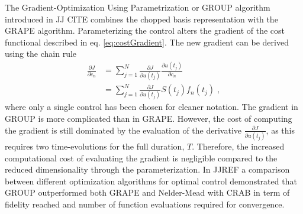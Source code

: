 The Gradient-Optimization Using Parametrization or \textsc{GROUP} algorithm introduced in JJ CITE combines the chopped basis representation with the \textsc{GRAPE} algorithm. Parameterizing the control alters the gradient of the cost functional described in eq. \eqref{eq:costGradient}. The new gradient can be derived using the chain rule
\begin{align}
	\frac{\partial J }{\partial c_n} &= \sum_{j = 1}^{N} \frac{\partial J }{\partial u(t_j)} \frac{\partial u(t_j)}{\partial c_n} \nonumber \\
	&= \sum_{j = 1}^{N} \frac{\partial J }{\partial u(t_j)} S(t_j) f_n(t_j) \; , \label{eq:GROUPgradient} 
\end{align}
where only a single control has been chosen for cleaner notation. The gradient in \textsc{GROUP} is more complicated than in \textsc{GRAPE}. However, the cost of computing the gradient is still dominated by the evaluation of the derivative $\frac{\partial J }{\partial u(t_j)}$, as this requires two time-evolutions for the full duration, $T$. Therefore, the increased computational cost of evaluating the gradient is negligible compared to the reduced dimensionality through the parameterization. 
In JJREF a comparison between different optimization algorithms for optimal control demonstrated that \textsc{GROUP} outperformed both \textsc{GRAPE} and Nelder-Mead with \textsc{CRAB} in term of fidelity reached and number of function evaluations required for convergence.

